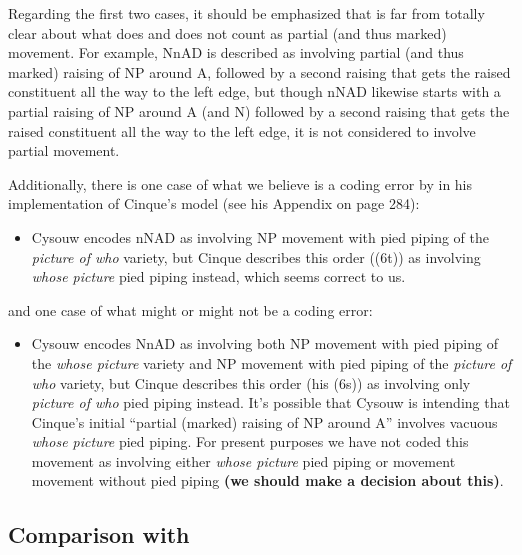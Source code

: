 \documentclass[11pt]{article}
\begin{document}
%
Regarding the first two cases, it should be emphasized that
\citet{cinque2005deriving} is far from totally clear about what does and
does not count as partial (and thus marked) movement.  For example,
NnAD is described as involving partial (and thus marked) raising of NP
around A, followed by a second raising that gets the raised
constituent all the way to the left edge, but though nNAD likewise starts
with a partial raising of NP around A (and N) followed by a second
raising that gets the raised constituent all the way to the left edge,
it is not considered to involve partial movement.

Additionally, there is one case of what we believe is a coding error
by \citet{cysouw2010dealing} in his implementation of Cinque's model
(see his Appendix on page 284): 

\begin{itemize}
\item Cysouw encodes nNAD as involving NP movement with pied piping of
  the \emph{picture of who} variety, but Cinque describes this order
  ((6t)) as involving \emph{whose picture} pied piping instead, which
  seems correct to us.
\end{itemize}
%
and one case of what might or might not be a coding error:
%
\begin{itemize}
 \item Cysouw encodes NnAD as involving both NP movement with pied
  piping of the \emph{whose picture} variety and NP movement with pied
  piping of the \emph{picture of who} variety, but Cinque describes
  this order (his (6s)) as involving only \emph{picture of who} pied
  piping instead.  It's possible that Cysouw is intending that
  Cinque's initial ``partial (marked) raising of NP around A''
  involves vacuous \emph{whose picture} pied piping.  For present
  purposes we have not coded this movement as involving either
  \emph{whose picture} pied piping or movement movement without pied
  piping \textbf{(we should make a decision about this)}.
\end{itemize}

\subsection{Comparison with \citet{merlo2015predicting}}
\end{document}
